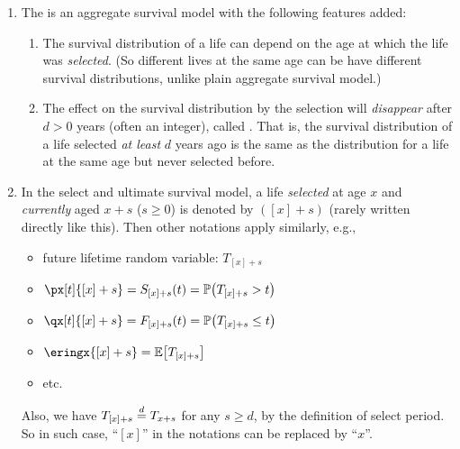 \begin{enumerate}
\item The  is an aggregate survival
model with the following features added:
\begin{enumerate}
\item The survival distribution of a life can depend on the age at which
the life was \emph{selected}. (So different lives at the same age can be have
different survival distributions, unlike plain aggregate survival model.)
\item The effect on the survival distribution by the selection will
\emph{disappear} after \(d>0\) years (often an integer), called . That is, the survival distribution of a life selected \emph{at
least} \(d\) years ago is the same as the distribution for a life at the same
age but never selected before.
\end{enumerate}
\item In the select and ultimate survival model, a life \emph{selected} at age
\(x\) and \emph{currently} aged \(x+s\) (\(s\ge 0\)) is denoted by \(([x]+s)\)
(rarely written directly like this). Then other notations apply similarly,
e.g.,
\begin{itemize}
\item future lifetime random variable: \(T_{[x]+s}\)
\item \(\px[t]{[x]+s}=S_{[x]+s}(t)=\prob{T_{[x]+s}>t}\)
\item \(\qx[t]{[x]+s}=F_{[x]+s}(t)=\prob{T_{[x]+s}\le t}\)
\item \(\eringx{[x]+s}=\expv{T_{[x]+s}}\)
\item etc.
\end{itemize}
Also, we have \(T_{[x]+s}\overset{d}= T_{x+s}\) for any \(s\ge d\), by the
definition of select period. So in such case, ``\([x]\)'' in the notations can
be replaced by ``\(x\)''.


\end{enumerate}
